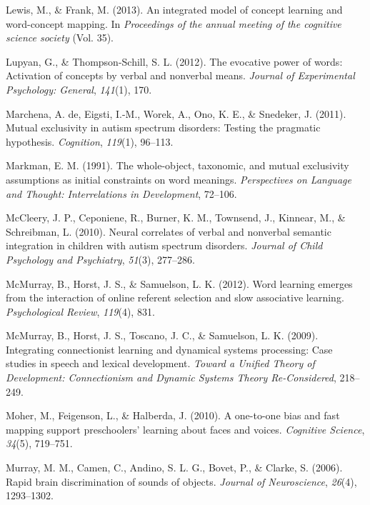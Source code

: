 \documentclass[english,floatsintext,man]{apa6}
\theoremstyle{definition}
\theoremstyle{definition}
\theoremstyle{definition}
\theoremstyle{remark}
\begin{document}
\hypertarget{ref-lewis2013integrated}{}
Lewis, M., \& Frank, M. (2013). An integrated model of concept learning
and word-concept mapping. In \emph{Proceedings of the annual meeting of
the cognitive science society} (Vol. 35).

\hypertarget{ref-lupyan2012evocative}{}
Lupyan, G., \& Thompson-Schill, S. L. (2012). The evocative power of
words: Activation of concepts by verbal and nonverbal means.
\emph{Journal of Experimental Psychology: General}, \emph{141}(1), 170.

\hypertarget{ref-de2011mutual}{}
Marchena, A. de, Eigsti, I.-M., Worek, A., Ono, K. E., \& Snedeker, J.
(2011). Mutual exclusivity in autism spectrum disorders: Testing the
pragmatic hypothesis. \emph{Cognition}, \emph{119}(1), 96--113.

\hypertarget{ref-markman1991whole}{}
Markman, E. M. (1991). The whole-object, taxonomic, and mutual
exclusivity assumptions as initial constraints on word meanings.
\emph{Perspectives on Language and Thought: Interrelations in
Development}, 72--106.

\hypertarget{ref-mccleery2010neural}{}
McCleery, J. P., Ceponiene, R., Burner, K. M., Townsend, J., Kinnear,
M., \& Schreibman, L. (2010). Neural correlates of verbal and nonverbal
semantic integration in children with autism spectrum disorders.
\emph{Journal of Child Psychology and Psychiatry}, \emph{51}(3),
277--286.

\hypertarget{ref-mcmurray2012word}{}
McMurray, B., Horst, J. S., \& Samuelson, L. K. (2012). Word learning
emerges from the interaction of online referent selection and slow
associative learning. \emph{Psychological Review}, \emph{119}(4), 831.

\hypertarget{ref-mcmurray2009integrating}{}
McMurray, B., Horst, J. S., Toscano, J. C., \& Samuelson, L. K. (2009).
Integrating connectionist learning and dynamical systems processing:
Case studies in speech and lexical development. \emph{Toward a Unified
Theory of Development: Connectionism and Dynamic Systems Theory
Re-Considered}, 218--249.

\hypertarget{ref-moher2010one}{}
Moher, M., Feigenson, L., \& Halberda, J. (2010). A one-to-one bias and
fast mapping support preschoolers' learning about faces and voices.
\emph{Cognitive Science}, \emph{34}(5), 719--751.

\hypertarget{ref-murray2006rapid}{}
Murray, M. M., Camen, C., Andino, S. L. G., Bovet, P., \& Clarke, S.
(2006). Rapid brain discrimination of sounds of objects. \emph{Journal
of Neuroscience}, \emph{26}(4), 1293--1302.
\end{document}
